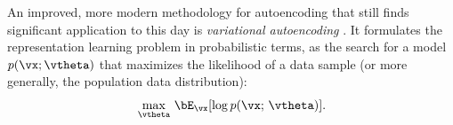 \documentclass[../../book-main.tex]{subfiles}
\begin{document}
An improved, more modern methodology for autoencoding that still finds
significant application to this day is \textit{variational autoencoding}
\cite{Kingma2013-sb,Kingma2019-zh}.
%
It formulates the representation learning problem in probabilistic terms, as the
search for a model $p(\vx; \vtheta)$
that maximizes the likelihood of a data sample (or more generally, the
population data distribution):
\begin{equation*}
    \max_{\vtheta}\, \bE_{\vx}[ \log p(\vx;\, \vtheta) ].
\end{equation*}
\end{document}
